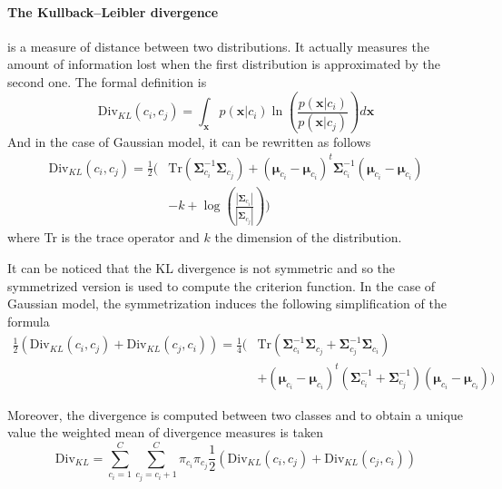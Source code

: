 \documentclass[a4paper]{article}
\begin{document}
        \paragraph{The Kullback–Leibler divergence} is a measure of distance between two distributions. It actually measures the amount of information lost when the first distribution is approximated by the second one. The formal definition is
        \begin{equation}
            \text{Div}_{KL}(c_i,c_j) = \int_\mathbf{x} p(\mathbf{x}|c_i) \ln(\frac{p(\mathbf{x}|c_i)}{p(\mathbf{x}|c_j)}) d\mathbf{x}
        \end{equation}
        And in the case of Gaussian model, it can be rewritten as follows
        \begin{align}
            \text{Div}_{KL}(c_i,c_j) = \frac{1}{2} \Biggl( &\text{Tr} (\boldsymbol{\Sigma}_{c_i}^{-1} \boldsymbol{\Sigma}_{c_j}) + (\boldsymbol{\mu}_{c_i} - \boldsymbol{\mu}_{c_i})^t \boldsymbol{\Sigma}_{c_i}^{-1} (\boldsymbol{\mu}_{c_i} - \boldsymbol{\mu}_{c_i}) \nonumber \\
            &- k + \log \left( \frac{|\boldsymbol{\Sigma}_{c_i}|}{|\boldsymbol{\Sigma}_{c_j}|} \right) \Biggr)
        \end{align}
        where Tr is the trace operator and $k$ the dimension of the distribution.

        It can be noticed that the KL divergence is not symmetric and so the symmetrized version is used to compute the criterion function. In the case of Gaussian model, the symmetrization induces the following simplification of the formula
        \begin{align}
            \frac{1}{2} (\text{Div}_{KL}(c_i,c_j) + \text{Div}_{KL}(c_j,c_i)) = \frac{1}{4} \Biggl( &\text{Tr} (\boldsymbol{\Sigma}_{c_i}^{-1} \boldsymbol{\Sigma}_{c_j} + \boldsymbol{\Sigma}_{c_j}^{-1} \boldsymbol{\Sigma}_{c_i}) \nonumber \\
            &+ (\boldsymbol{\mu}_{c_i} - \boldsymbol{\mu}_{c_i})^t (\boldsymbol{\Sigma}_{c_i}^{-1} + \boldsymbol{\Sigma}_{c_j}^{-1}) (\boldsymbol{\mu}_{c_i} - \boldsymbol{\mu}_{c_i}) \Biggr)
        \end{align}

        Moreover, the divergence is computed between two classes and to obtain a unique value the weighted mean of divergence measures is taken
        \begin{equation}
            \text{Div}_{KL} = \sum_{c_i=1}^{C} \sum_{c_j=c_i + 1}^{C} \pi_{c_i} \pi_{c_j} \frac{1}{2} (\text{Div}_{KL}(c_i,c_j) + \text{Div}_{KL}(c_j,c_i))
        \end{equation}
\end{document}
